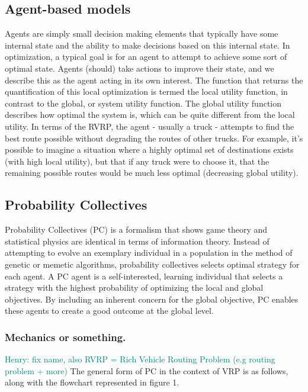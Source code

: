 \documentclass{sig-alternate}
\newcommand{\allcomments}[1]{{#1}}
\newcommand{\hfcomment}[1]{\textcolor{Teal}{\allcomments{Henry: {#1}}}}
\begin{document}
\subsection{Agent-based models}
\label{ssec:agents}
Agents are simply small decision making elements that typically have some internal state and the ability to make decisions based on this internal state. In optimization, a typical goal is for an agent to attempt to achieve some sort of optimal state. Agents (should) take actions to improve their state, and we describe this as the agent acting in its own interest. The function that returns the quantification of this local optimization is termed the local utility function, in contrast to the global, or system utility function. The global utility function describes how optimal the system is, which can be quite different from the local utility. In terms of the RVRP, the agent - usually a truck - attempts to find the best route possible without degrading the routes of other trucks. For example, it's possible to imagine a situation where a highly optimal set of destinations exists (with high local utility), but that if any truck were to choose it, that the remaining possible routes would be much less optimal (decreasing global utility).

\subsection{Probability Collectives}
\label{ssec:PC}
Probability Collectives (PC) is a formalism that shows game theory and statistical physics are identical in terms of information theory\cite{Kulkarni:2008}. Instead of attempting to evolve an exemplary individual in a population in the method of genetic or memetic algorithms, probability collectives selects optimal strategy for each agent. A PC agent is a self-interested, learning individual that selects a strategy with the highest probability of optimizing the local and global objectives. By including an inherent concern for the global objective, PC enables these agents to create a good outcome at the global level.

\subsubsection{Mechanics or something.}
\hfcomment{fix name, also RVRP = Rich Vehicle Routing Problem (e.g routing problem + more)}
The general form of PC in the context of VRP is as follows, along with the flowchart represented in figure 1.
\end{document}
